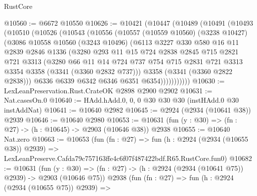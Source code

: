 \begin{lexlean}{RustCore}
\begin{coremodule}
@10560 := @6672 @10550
@10626 := @10421
    (@10447
      (@10489
        (@10491
          (@10493
            (@10510
              (@10526
                (@10543
                  (@10556
                    (@10557
                      (@10559 @10560)
                      (@3238 @10427)
                      (@3086
                        @10558
                        @10560
                        (@3243 @10496)
                        (@6113
                          @3227
                          @330
                          @580
                          @16
                          @11
                          @2839
                          @2846
                          @1336
                          (@3280
                            @293
                            @11
                            @15
                            @724
                            @2838
                            @2845
                            @715
                            @2821
                            @721
                            @3313
                            (@3280
                              @66
                              @11
                              @14
                              @724
                              @737
                              @754
                              @715
                              @2831
                              @721
                              @3313
                              @3354
                              @3358
                              (@3341 (@3360 @2832 @737)))
                            @3358
                            (@3341 (@3360 @2822 @2838)))
                          @6336
                          @6339
                          @6342
                          @6346
                          @6351
                          @6354)))))))))))
@10630 := LexLeanPreservation.Rust.CrateOK @2898 @2900 @2902
@10631 := Nat.casesOn.{0}
@10640 := HAdd.hAdd.{0, 0, 0} @30 @30 @30 (instHAdd.{0} @30 instAddNat)
@10641 := @10640 @2982
@10645 := @2924 (@2934 (@10641 @38)) @2939
@10646 := @10640 @2980
@10653 := @10631 (fun (y : @30) => (fn : @27) -> (h : @10645) -> @2903 (@10646 @38)) @2938
@10655 := @10640 Nat.zero
@10663 := @10653
    (fun (fn : @27) =>
    fun (h : @2924 (@2934 (@10655 @38)) @2939) =>
    LexLeanPreserve.Cafda79c757163ffe4c6f07f487422bdf.R65.RustCore.fun0)
@10682 := @10631
    (fun (y : @30) => (fn : @27) -> (h : @2924 (@2934 (@10641 @75)) @2939) -> @2903 (@10646 @75))
    @2938
    (fun (fn : @27) =>
    fun (h : @2924 (@2934 (@10655 @75)) @2939) =>

\end{coremodule}
\end{lexlean}
